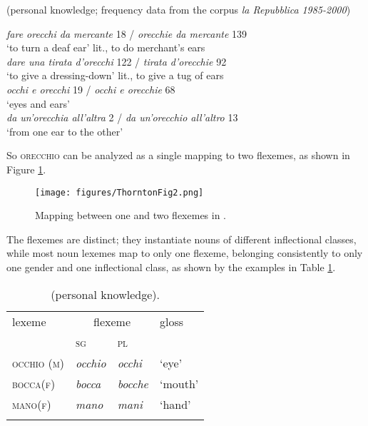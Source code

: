 \documentclass[output=paper]{langsci/langscibook}
\begin{document}
\ea\label{ex:Thornton:11}  (personal knowledge; frequency data from the corpus \emph{la Repubblica} \emph{1985-2000})

\ea\label{ex:Thornton:11a}\emph{fare orecchi da mercante} 18 / \emph{orecchie da mercante} 139\\

\glt `to turn a deaf ear' lit., to do merchant's ears\\

\ex\label{ex:Thornton:11b}\emph{dare una tirata d'orecchi} 122 / \emph{tirata d'orecchie} 92\\
\glt `to give a dressing-down' lit., to give a tug of ears\\

\ex\label{ex:Thornton:11c}\emph{occhi e orecchi} 19 / \emph{occhi e orecchie} 68\\
\glt `eyes and ears'\\

\ex\label{ex:Thornton:11d}\emph{da un'orecchia all'altra} 2 / \emph{da un'orecchio all'altro} 13\\
\glt `from one ear to the other'\\
\z
\z

So  \textsc{orecchio} can be analyzed as a single  mapping
to two flexemes, as shown in Figure \ref{fig:Thornton:2}.

\begin{figure}
\texttt{[image: figures/ThorntonFig2.png]}
\caption{Mapping between one  and two flexemes in .}
\label{fig:Thornton:2}
\end{figure}
 
The flexemes are distinct; they instantiate nouns of different
inflectional classes, while most  noun lexemes map to only one
flexeme, belonging consistently to only one gender and one inflectional
class, as shown by the examples in Table \ref{tab:Thornton:2}.

  \begin{table}
  \begin{tabular}{llll}
  \lsptoprule
lexeme & \multicolumn{2}{c}{flexeme} & gloss\\
& \textsc{sg} & \textsc{pl} &\\
\midrule
\textsc{occhio (m)} & \emph{occhio} & \emph{occhi} & `eye'\\
\textsc{bocca(f)} & \emph{bocca} & \emph{bocche} & `mouth'\\
\textsc{mano(f)} & \emph{mano} & \emph{mani} & `hand'\\

\lspbottomrule
\end{tabular}
\caption{ (personal knowledge).}
\label{tab:Thornton:2}
\end{table}
\end{document}
